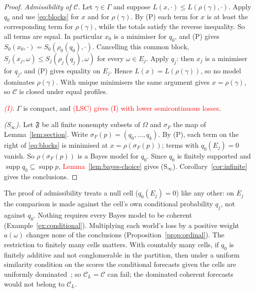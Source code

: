 \documentclass[11pt]{article}
\theoremstyle{definition}
\theoremstyle{remark}
\newcommand{\C}{\mathcal C}
\newcommand{\F}{\mathfrak F}
\newcommand{\supp}{\operatorname{supp}}
\begin{document}
\begin{proof}
\emph{Admissibility of $\C$.} Let $\gamma\in\Gamma$ and suppose $L(x,\cdot)\le L(\rho(\gamma),\cdot)$. Apply $q_0$ and use \eqref{eq:blocks} for $x$ and for $\rho(\gamma)$. By (P) each term for $x$ is at least the corresponding term for $\rho(\gamma)$, while the totals satisfy the reverse inequality. So all terms are equal. In particular $x_0$ is a minimiser for $q_0$, and (P) gives $S_0(x_0,\cdot)=S_0(\rho_0(q_0),\cdot)$. Cancelling this common block, $S_j(x_j,\omega)\le S_j(\rho_j(q_j),\omega)$ for every $\omega\in E_j$. Apply $q_j$: then $x_j$ is a minimiser for $q_j$, and (P) gives equality on $E_j$. Hence $L(x)=L(\rho(\gamma))$, so no model dominates $\rho(\gamma)$. With unique minimisers the same argument gives $x=\rho(\gamma)$, so $\C$ is closed under equal profiles.

\emph{\textcolor{red}{(I)}.} $\Gamma$ is compact, and \textcolor{red}{(LSC)} \textcolor{red}{gives (I) with lower semicontinuous losses}.

\emph{(S$_\infty$).} Let $\F$ be all finite nonempty subsets of $\Omega$ and $\sigma_F$ the map of Lemma~\ref{lem:section}. Write $\sigma_F(p)=(q_0,\dots,q_k)$. By (P), each term on the right of \eqref{eq:blocks} is minimised at $x=\rho(\sigma_F(p))$; terms with $q_0(E_j)=0$ vanish. So $\rho(\sigma_F(p))$ is a Bayes model for $q_0$. Since $q_0$ is finitely supported and $\supp q_0\subseteq\supp p$, \textcolor{red}{Lemma~\ref{lem:bayes-choice}} gives (S$_\infty$). Corollary~\ref{cor:infinite} gives the conclusions.
\end{proof}
The proof of admissibility treats a null cell ($q_0(E_j)=0$) like any other: on $E_j$ the comparison is made against the cell's own conditional probability $q_j$, not against $q_0$. Nothing requires every Bayes model to be coherent (Example~\ref{ex:conditional}). Multiplying each world's loss by a positive weight $a(\omega)$ changes none of the conclusions (Proposition~\ref{prop:ordinal}). The restriction to finitely many cells matters. With countably many cells, if $q_0$ is finitely additive and not conglomerable in the partition, then under a uniform similarity condition on the scores the conditional forecasts given the cells are uniformly dominated~\cite[Theorem~2]{SSK14}; so $\C_L=\C$ can fail; the dominated coherent forecasts would not belong to $\C_L$.
\end{document}
